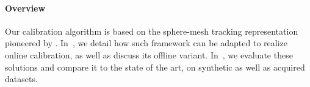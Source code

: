 \paragraph{Overview}
Our calibration algorithm is based on the sphere-mesh tracking representation pioneered by \cite{tkach2016sphere}. In~, we detail how such framework can be adapted to realize online calibration, as well as discuss its offline variant. In~, we evaluate these solutions and compare it to the state of the art, on synthetic as well as acquired datasets.


